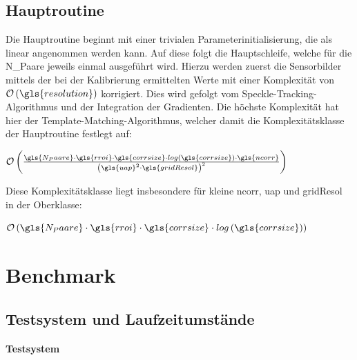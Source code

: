 \subsection{Hauptroutine}

Die Hauptroutine beginnt mit einer trivialen Parameterinitialisierung, die als linear angenommen werden kann. Auf diese folgt die Hauptschleife, welche für die \gls{N_Paare} jeweils einmal ausgeführt wird. Hierzu werden zuerst die Sensorbilder mittels der bei der Kalibrierung ermittelten Werte mit einer Komplexität von $\mathcal{O}\left(\gls{resolution}\right)$ korrigiert. Dies wird gefolgt vom Speckle-Tracking-Algorithmus und der Integration der Gradienten. Die höchste Komplexität hat hier der Template-Matching-Algorithmus, welcher damit die Komplexitätsklasse der Hauptroutine festlegt auf:

\begin{center}
	$\mathcal{O}\left(\frac{\gls{N_Paare} \cdot\gls{rroi} \cdot \gls{corrsize} \cdot log\left(\gls{corrsize}\right) \cdot \gls{ncorr}}{\left(\gls{uap}^2 \cdot \gls{gridResol}\right)^2}\right)$
\end{center}

Diese Komplexitätsklasse liegt insbesondere für kleine \gls{ncorr}, \gls{uap} und \gls{gridResol} in der Oberklasse:

\begin{center}
	$\mathcal{O}\left(\gls{N_Paare} \cdot \gls{rroi} \cdot \gls{corrsize} \cdot log\left(\gls{corrsize}\right)\right)$
\end{center}

\section{Benchmark}

\subsection{Testsystem und Laufzeitumstände}

\paragraph{Testsystem}

